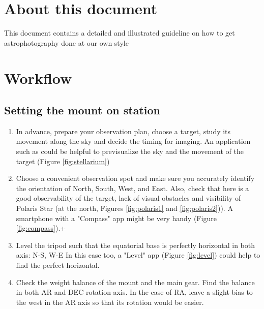 \documentclass[a4paper,landscape,english,12pt]{article}
\begin{document}

\section*{About this document}
This document contains a detailed and illustrated guideline on how to get astrophotography done at our own style
\section{Workflow}
\begin{multicols}{2}
	
\subsection{Setting the mount on station}
\begin{enumerate}
	\item In advance, prepare your observation plan, choose a target, study its movement along the sky and decide the timing for imaging. An application such as   could be helpful to previsualize the sky and the movement of the target (Figure \ref{fig:stellarium})
	
	
	\item Choose a convenient observation spot and make sure you accurately identify the orientation of North, South, West, and East. Also, check that here is a good observability of the target, lack of visual obstacles and visibility of Polaris Star (at the north, Figures \ref{fig:polaris1} and \ref{fig:polaris2})). A smartphone with a "Compass" app might be very handy (Figure \ref{fig:compass}).+
	
	\item Level the tripod such that the equatorial base is perfectly horizontal in both axis: N-S, W-E In this case too, a "Level" app (Figure \ref{fig:level}) could help to find the perfect horizontal.
	
	\item Check the weight balance of the mount and the main gear. Find the balance in both AR and DEC rotation axis. In the case of RA, leave a slight bias to the west in the AR axis so that its rotation would be easier.
	

\end{enumerate}
\end{multicols}
\end{document}
